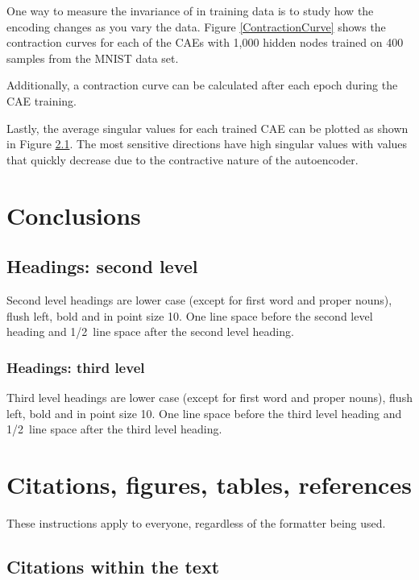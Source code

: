 \documentclass{article} %
\begin{document}
One way to measure the invariance of in training data is to study how the encoding changes as you vary the data. Figure \ref{ContractionCurve} shows the contraction curves for each of the CAEs with 1,000 hidden nodes trained on 400 samples from the MNIST data set.


Additionally, a contraction curve can be calculated after each epoch during the CAE training.


Lastly, the average singular values for each trained CAE can be plotted as shown in Figure \ref{}. The most sensitive directions have high singular values with values that quickly decrease due to the contractive nature of the autoencoder.

\section{Conclusions}


\subsection{Headings: second level}

Second level headings are lower case (except for first word and proper nouns),
flush left, bold and in point size 10. One line space before the second level
heading and 1/2~line space after the second level heading.

\subsubsection{Headings: third level}

Third level headings are lower case (except for first word and proper nouns),
flush left, bold and in point size 10. One line space before the third level
heading and 1/2~line space after the third level heading.

\section{Citations, figures, tables, references}
\label{others}

These instructions apply to everyone, regardless of the formatter being used.

\subsection{Citations within the text}
\end{document}
